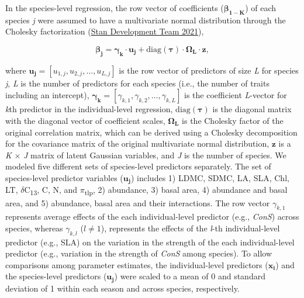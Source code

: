 \documentclass[
  12pt,
  letterpaper,
  DIV=11,
  numbers=noendperiod]{scrartcl}
\begin{document}
In the species-level regression, the row vector of coefficients
(\(\boldsymbol{\beta_{1-K}}\)) of each species \emph{j} were assumed to
have a multivariate normal distribution through the Cholesky
factorization (\protect\hyperlink{ref-StanDevelopmentTeam2021}{Stan
Development Team 2021}),

\[
\boldsymbol{\beta_j} = \boldsymbol{\gamma_k} \cdot \boldsymbol{u_j} + \mathrm{diag}(\boldsymbol{\tau})\cdot \boldsymbol{\Omega_L} \cdot \boldsymbol{z},
\]

where
\(\boldsymbol{u_{j}} = \left[u_{1,j}, u_{2,j}, \ldots, u_{L,j} \right]\)
is the row vector of predictors of size \emph{L} for species \emph{j},
\emph{L} is the number of predictors for each species (i.e., the number
of traits including an intercept),
\(\boldsymbol{\gamma_k} = \left[\gamma_{k,1}, \gamma_{k,2}, \ldots, \gamma_{k,L} \right]\)
is the coefficient \emph{L}-vector for \emph{k}th predictor in the
individual-level regression, \(\mathrm{diag}(\boldsymbol{\tau})\) is the
diagonal matrix with the diagonal vector of coefficient scales,
\(\boldsymbol{\Omega_L}\) is the Cholesky factor of the original
correlation matrix, which can be derived using a Cholesky decomposition
for the covariance matrix of the original multivariate normal
distribution, \(\boldsymbol{z}\) is a \emph{K} \(\times\) \emph{J}
matrix of latent Gaussian variables, and \emph{J} is the number of
species. We modeled five different sets of species-level predictors
separately. The set of species-level predictor variables
(\(\boldsymbol{u_j}\)) includes 1) LDMC, SDMC, LA, SLA, Chl, LT,
\(\delta\)C\textsubscript{13}, C, N, and \(\pi\)\textsubscript{tlp}, 2)
abundance, 3) basal area, 4) abundance and basal area, and 5) abundance,
basal area and their interactions. The row vector \(\gamma_{k,1}\)
represents average effects of the each individual-level predictor (e.g.,
\emph{ConS}) across species, whereas \(\gamma_{k, l}\) (\(l \ne 1\)),
represents the effects of the \emph{l}-th individual-level predictor
(e.g., SLA) on the variation in the strength of the each
individual-level predictor (e.g., variation in the strength of
\emph{ConS} among species). To allow comparisons among parameter
estimates, the individual-level predictors (\(\boldsymbol{x_i}\)) and
the species-level predictors (\(\boldsymbol{u_j}\)) were scaled to a
mean of 0 and standard deviation of 1 within each season and across
species, respectively.
\end{document}
